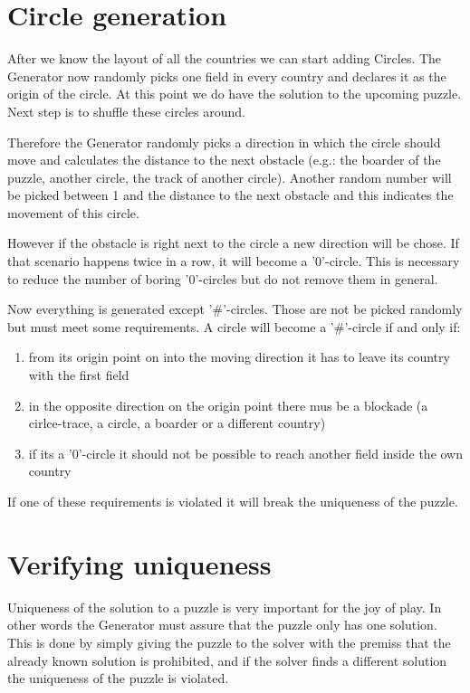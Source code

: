 \section{Circle generation}
After we know the layout of all the countries we can start adding Circles. The Generator now randomly picks one field in every country and declares it as the origin of the circle. At this point we do have the solution to the upcoming puzzle. Next step is to shuffle these circles around.

Therefore the Generator randomly picks a direction in which the circle should move and calculates the distance to the next obstacle (e.g.: the boarder of the puzzle, another circle, the track of another circle). Another random number will be picked between 1 and the distance to the next obstacle and this indicates the movement of this circle. 

However if the obstacle is right next to the circle a new direction will be chose. If that scenario happens twice in a row, it will become a '0'-circle. This is necessary to reduce the number of boring '0'-circles but do not remove them in general.

Now everything is generated except '\#'-circles. Those are not be picked randomly but must meet some requirements. A circle will become a '\#'-circle if and only if:
\begin{enumerate}
  \item from its origin point on into the moving direction it has to leave its country with the first field
  \item in the opposite direction on the origin point there mus be a blockade (a cirlce-trace, a circle, a boarder or a different country)
  \item if its a '0'-circle it should not be possible to reach another field inside the own country
\end{enumerate}
If one of these requirements is violated it will break the uniqueness of the puzzle.

\section{Verifying uniqueness}
Uniqueness of the solution to a puzzle is very important for the joy of play. In other words the Generator must assure that the puzzle only has one solution. This is done by simply giving the puzzle to the solver with the premiss that the already known solution is prohibited, and if the solver finds a different solution the uniqueness of the puzzle is violated.

